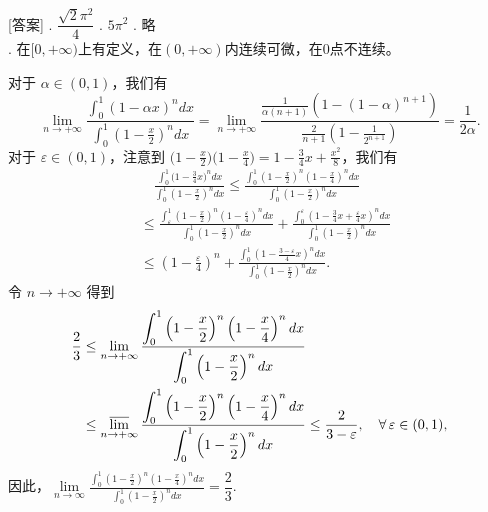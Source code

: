 [答案] . $\dfrac{\sqrt{2}\pi^2}{4}$ . $5\pi^2$ . 略\\
\qquad{}. 在$[0,+\infty)$上有定义，在$(0,+\infty)$内连续可微，在$0$点不连续。
\begin{proofc}[6 的解答] 对于 $\alpha\in(0,1)$，我们有
\[\lim_{n \rightarrow+\infty} \frac{\displaystyle \int_0^1(1-\alpha x)^n dx}{\displaystyle \int_0^1\left(1-\frac{x}{2}\right)^n dx}
=\lim _{n \rightarrow+\infty} \frac{\displaystyle \frac{1}{\alpha(n+1)}\left(1-(1-\alpha)^{n+1}\right)}{\displaystyle \frac{2}{n+1}\left(1-\frac{1}{2^{n+1}}\right)}=\frac{1}{2\alpha}.\]
对于 $\varepsilon\in(0,1)$，注意到 $\displaystyle \Big(1-\frac{x}{2}\Big)\Big(1-\frac{x}{4}\Big)=1-\frac{3}{4}x+\frac{x^2}{8}$，我们有
\begin{align*}
& \quad\frac{\displaystyle \int_0^1\Big(1-\frac{3}{4} x\Big)^n d x}{\displaystyle \int_0^1\left(1-\frac{x}{2}\right)^n dx} 
\leq \frac{\displaystyle \int_0^1\left(1-\frac{x}{2}\right)^n\left(1-\frac{x}{4}\right)^n dx}{\displaystyle \int_0^1\left(1-\frac{x}{2}\right)^n dx} \\
& \leq \frac{\displaystyle \int_{\varepsilon}^1\left(1-\frac{x}{2}\right)^n\left(1-\frac{\varepsilon}{4}\right)^n dx}{\displaystyle \int_0^1\left(1-\frac{x}{2}\right)^n dx}
+\frac{\displaystyle \int_0^{\varepsilon}\left(1-\frac{3}{4} x+\frac{\varepsilon}{4} x\right)^n dx}{\displaystyle \int_0^1\left(1-\frac{x}{2}\right)^n dx} \\
& \leq \left(1-\frac{\varepsilon}{4}\right)^n+\frac{\displaystyle \int_0^1\left(1-\frac{3-\varepsilon}{4} x\right)^n dx}{\displaystyle \int_0^1\left(1-\frac{x}{2}\right)^n dx}.
\end{align*}
令 $n \rightarrow+\infty$ 得到
\begin{align*}
\frac{2}{3} & \leq \lim_{n \rightarrow+\infty} \frac{\displaystyle \int_0^1\left(1-\frac{x}{2}\right)^n\left(1-\frac{x}{4}\right)^n dx}{\displaystyle \int_0^1\left(1-\frac{x}{2}\right)^n dx} \\
& \leq \varlimsup_{n \rightarrow+\infty} \frac{\displaystyle \int_0^1\left(1-\frac{x}{2}\right)^n\left(1-\frac{x}{4}\right)^n dx}{\displaystyle \int_0^1\left(1-\frac{x}{2}\right)^n dx} \leq \frac{2}{3-\varepsilon}, \quad \forall\,\varepsilon\in(0,1),
\end{align*}
因此，$\lim\limits_{n \rightarrow \infty} \frac{\displaystyle \int_0^1\left(1-\frac{x}{2}\right)^n\left(1-\frac{x}{4}\right)^n dx}{\displaystyle \int_0^1\left(1-\frac{x}{2}\right)^n dx}=\dfrac{2}{3}$.\end{proofc}

